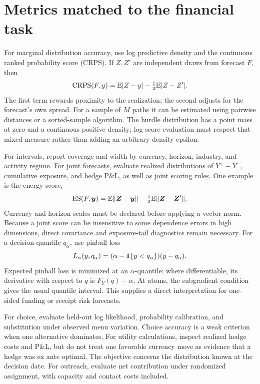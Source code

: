 \section{Metrics matched to the financial task}
For marginal distribution accuracy, use log predictive density and the continuous ranked probability score (CRPS). If $Z,Z'$ are independent draws from forecast $F$, then
\begin{equation}
\operatorname{CRPS}(F,y)=\mathbb E|Z-y|-\tfrac12\mathbb E|Z-Z'|.
\end{equation}
The first term rewards proximity to the realization; the second adjusts for the forecast's own spread. For a sample of $M$ paths it can be estimated using pairwise distances or a sorted-sample algorithm. The hurdle distribution has a point mass at zero and a continuous positive density; log-score evaluation must respect that mixed measure rather than adding an arbitrary density epsilon.

For intervals, report coverage and width by currency, horizon, industry, and activity regime. For joint forecasts, evaluate realized distributions of $Y^+-Y^-$, cumulative exposure, and hedge P\&L, as well as joint scoring rules. One example is the energy score,
\begin{equation}
\operatorname{ES}(F,\bm y)=\mathbb E\|\bm Z-\bm y\|-\tfrac12\mathbb E\|\bm Z-\bm Z'\|.
\end{equation}
Currency and horizon scales must be declared before applying a vector norm. Because a joint score can be insensitive to some dependence errors in high dimensions, direct covariance and exposure-tail diagnostics remain necessary. For a decision quantile $q_\alpha$, use pinball loss
\begin{equation}
L_\alpha(y,q_\alpha)=(\alpha-\mathbf 1\{y<q_\alpha\})(y-q_\alpha).
\end{equation}
Expected pinball loss is minimized at an $\alpha$-quantile: where differentiable, its derivative with respect to $q$ is $F_Y(q)-\alpha$. At atoms, the subgradient condition gives the usual quantile interval. This supplies a direct interpretation for one-sided funding or receipt risk forecasts.

For choice, evaluate held-out log likelihood, probability calibration, and substitution under observed menu variation. Choice accuracy is a weak criterion when one alternative dominates. For utility calculations, inspect realized hedge costs and P\&L, but do not treat one favorable currency move as evidence that a hedge was ex ante optimal. The objective concerns the distribution known at the decision date. For outreach, evaluate net contribution under randomized assignment, with capacity and contact costs included.

